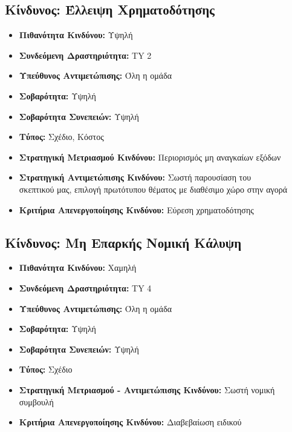 \documentclass[12pt,a4paper]{article}
\begin{document}
\subsection{Κίνδυνος: Έλλειψη Χρηματοδότησης}
\begin{itemize}
	\item \textbf{Πιθανότητα Κινδύνου:} Υψηλή
	\item \textbf{Συνδεόμενη Δραστηριότητα:} TY 2
	\item \textbf{Υπεύθυνος Αντιμετώπισης:} Όλη η ομάδα
	\item \textbf{Σοβαρότητα:} Υψηλή
	\item \textbf{Σοβαρότητα Συνεπειών:} Υψηλή
	\item \textbf{Τύπος:} Σχέδιο, Κόστος
	\item \textbf{Στρατηγική Μετριασμού Κινδύνου:} Περιορισμός μη αναγκαίων εξόδων
	\item \textbf{Στρατηγική Αντιμετώπισης Κινδύνου:} Σωστή παρουσίαση του \\σκεπτικού μας, επιλογή πρωτότυπου θέματος με διαθέσιμο χώρο στην αγορά
	\item \textbf{Κριτήρια Απενεργοποίησης Κινδύνου:} Εύρεση χρηματοδότησης
\end{itemize}

\subsection{Κίνδυνος: Μη Επαρκής Νομική Κάλυψη}
\begin{itemize}
	\item \textbf{Πιθανότητα Κινδύνου:} Χαμηλή
	\item \textbf{Συνδεόμενη Δραστηριότητα:} TY 4
	\item \textbf{Υπεύθυνος Αντιμετώπισης:} Όλη η ομάδα
	\item \textbf{Σοβαρότητα:} Υψηλή
	\item \textbf{Σοβαρότητα Συνεπειών:} Υψηλή
	\item \textbf{Τύπος:} Σχέδιο
	\item \textbf{Στρατηγική Μετριασμού - Αντιμετώπισης Κινδύνου:} Σωστή νομική συμβουλή
	\item \textbf{Κριτήρια Απενεργοποίησης Κινδύνου:} Διαβεβαίωση ειδικού
\end{itemize}
\end{document}
